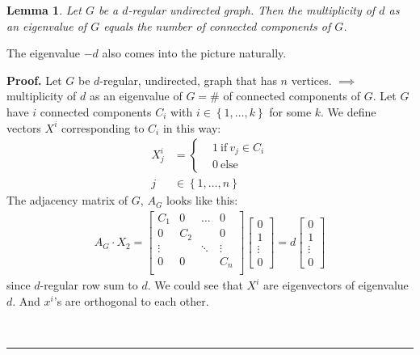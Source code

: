 \documentclass[12pt]{article}
\newtheorem{lemma}[theorem]{Lemma}
\newenvironment{proof}[1][Proof]{\textbf{#1.} }{\ \rule{0.5em}{0.5em}}
\begin{document}
\begin{lemma}
Let $G$ be a $d$-regular undirected graph. Then the multiplicity of $d$ as
an eigenvalue of $G$ equals the number of connected components of $G$.
\end{lemma}

The eigenvalue $-d$ also comes into the picture naturally.

\begin{proof}
    Let $G$ be $d$-regular, undirected, graph that has $n$ vertices.
    $\implies$ multiplicity of $d$ as an eigenvalue of $G = \#$ of connected components of $G$.
    Let $G$ have $i$ connected components $C_i$ with $ i \in \left\{ 1, \ldots, k \right\}$ 
    for some $k$.
    We define vectors $X^i$ corresponding to $C_i$ in this way:
    \begin{align}
        X^i_j &= \begin{cases}
            &1 \ \text{if} \ v_j \in C_i \\
            &0 \ \text{else}
        \end{cases} \\
        j &\in \left\{ 1, \ldots, n \right\}
    \end{align}
    The adjacency matrix of $G$, $A_G$ looks like this:
    \begin{align}
        A_G \cdot X_2 = 
        \begin{bmatrix}
            C_1 & 0 & \ldots & 0\\
            0 & C_2 & & 0\\
            \vdots & & \ddots & \vdots \\
            0 & 0 & & C_n \\
        \end{bmatrix} 
        \begin{bmatrix}
            0\\
            1\\
            \vdots\\
            0
        \end{bmatrix}
        = d
        \begin{bmatrix}
            0\\
            1\\
            \vdots\\
            0
        \end{bmatrix}
    \end{align}
    since $d$-regular row sum to $d$.
    We could see that $X^i$ are eigenvectors 
    of eigenvalue $d$. 
    And $x^i$'s are orthogonal to each other.

\end{proof}
\end{document}
